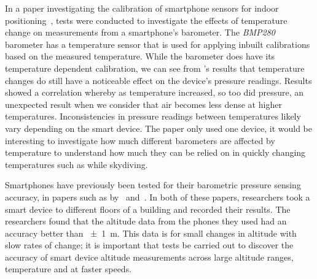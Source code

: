 \documentclass[11pt, twocolumn]{article}
\begin{document}
In a paper investigating the calibration of smartphone sensors for indoor positioning~\cite{keller_calibration_2012}, tests were conducted to investigate the effects of temperature change on measurements from a smartphone's barometer. The \textit{BMP280} barometer has a temperature sensor that is used for applying inbuilt calibrations based on the measured temperature. While the barometer does have its temperature dependent calibration, we can see from \citeauthor{keller_calibration_2012}'s results that temperature changes do still have a noticeable effect on the device's pressure readings. Results showed a correlation whereby as temperature increased, so too did pressure, an unexpected result when we consider that air becomes less dense at higher temperatures. Inconsistencies in pressure readings between temperatures likely vary depending on the smart device. The paper only used one device, it would be interesting to investigate how much different barometers are affected by temperature to understand how much they can be relied on in quickly changing temperatures such as while skydiving.

Smartphones have previously been tested for their barometric pressure sensing accuracy, in papers such as by~\textcite{keller_calibration_2012} and~\textcite{he_atmospheric_2012}. In both of these papers, researchers took a smart device to different floors of a building and recorded their results. The researchers found that the altitude data from the phones they used had an accuracy better than \SI{\pm1}{\metre}. This data is for small changes in altitude with slow rates of change; it is important that tests be carried out to discover the accuracy of smart device altitude measurements across large altitude ranges, temperature and at faster speeds.
\end{document}
